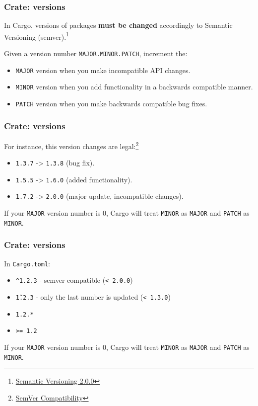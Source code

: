 \documentclass[aspectratio=1610,t]{beamer}
\begin{document}

\begin{frame}[fragile]
\frametitle{Crate: versions}
In Cargo, versions of packages \textbf{must be changed} accordingly to Semantic Versioning (semver).\footnote{\href{https://semver.org}{Semantic Versioning 2.0.0}}

Given a version number \texttt{MAJOR.MINOR.PATCH}, increment the:

\begin{itemize}
    \item \texttt{MAJOR} version when you make incompatible API changes.
    \item \texttt{MINOR} version when you add functionality in a backwards compatible manner.
    \item \texttt{PATCH} version when you make backwards compatible bug fixes.
\end{itemize}
\end{frame}


\begin{frame}[fragile]
\frametitle{Crate: versions}
For instance, this version changes are legal:\footnote{\href{https://doc.rust-lang.org/cargo/reference/semver.html}{SemVer Compatibility}}

\begin{itemize}
    \item \texttt{1.3.7} -> \texttt{1.3.8} (bug fix).
    \item \texttt{1.5.5} -> \texttt{1.6.0} (added functionality).
    \item \texttt{1.7.2} -> \texttt{2.0.0} (major update, incompatible changes).
\end{itemize}

If your \texttt{MAJOR} version number is 0, Cargo will treat \texttt{MINOR} as \texttt{MAJOR} and \texttt{PATCH} as \texttt{MINOR}.
\end{frame}


\begin{frame}[fragile]
\frametitle{Crate: versions}
In \texttt{Cargo.toml}:

\begin{itemize}
    \item \texttt{\^{}1.2.3} - semver compatible (\texttt{< 2.0.0})
    \item \texttt{\~1.2.3} - only the last number is updated (\texttt{< 1.3.0})
    \item \texttt{1.2.*}
    \item \texttt{>= 1.2}
\end{itemize}

If your \texttt{MAJOR} version number is 0, Cargo will treat \texttt{MINOR} as \texttt{MAJOR} and \texttt{PATCH} as \texttt{MINOR}.
\end{frame}
\end{document}
